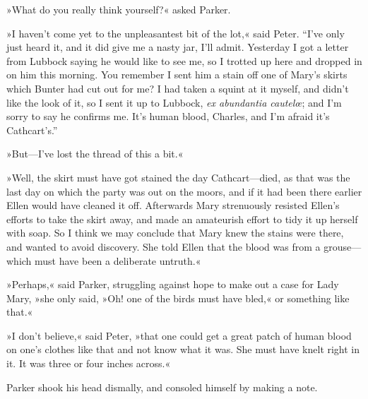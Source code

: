 »What do you really think yourself?« asked Parker.

»I haven't come yet to the unpleasantest bit of the lot,« said Peter.  \enquote{I've only just heard it, and it did give me a nasty jar, I'll admit.  Yesterday I got a letter from Lubbock saying he would like to see me, so I trotted up here and dropped in on him this morning. You remember I sent him a stain off one of Mary's skirts which Bunter had cut out for me? I had taken a squint at it myself, and didn't like the look of it, so I sent it up to Lubbock, \textit{ex abundantia cautelœ}; and I'm sorry to say he confirms me. It's human blood, Charles, and I'm afraid it's Cathcart's.}

»But\allowbreak---\allowbreak I've lost the thread of this a bit.«

»Well, the skirt must have got stained the day Cathcart\allowbreak---\allowbreak died, as that was the last day on which the party was out on the moors, and if it had been there earlier Ellen would have cleaned it off. Afterwards Mary strenuously resisted Ellen's efforts to take the skirt away, and made an amateurish effort to tidy it up herself with soap. So I think we may conclude that Mary knew the stains were there, and wanted to avoid discovery. She told Ellen that the blood was from a grouse\allowbreak---\allowbreak which must have been a deliberate untruth.«

»Perhaps,« said Parker, struggling against hope to make out a case for Lady Mary, »she only said, »Oh! one of the birds must have bled,« or something like that.«

»I don't believe,« said Peter, »that one could get a great patch of human blood on one's clothes like that and not know what it was. She must have knelt right in it. It was three or four inches across.«

Parker shook his head dismally, and consoled himself by making a note.

